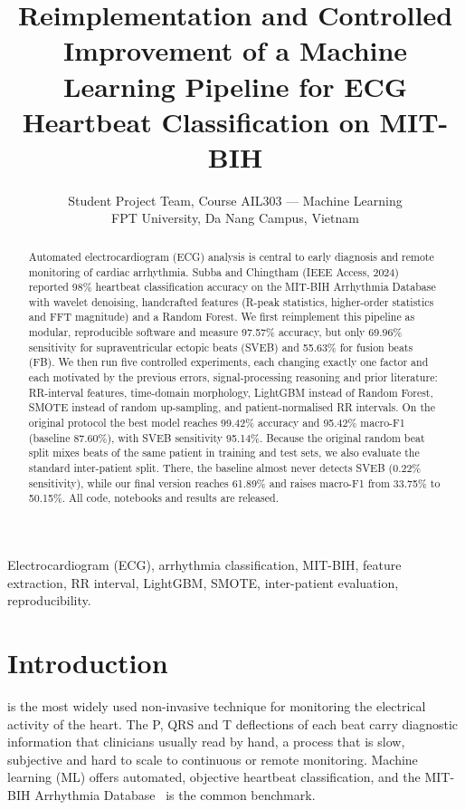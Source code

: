 \documentclass[journal]{IEEEtran}
\begin{document}
\title{Reimplementation and Controlled Improvement of a Machine Learning Pipeline for ECG Heartbeat Classification on MIT-BIH}

\author{Student Project Team, Course AIL303 --- Machine Learning\\
FPT University, Da Nang Campus, Vietnam}

\maketitle

\begin{abstract}
Automated electrocardiogram (ECG) analysis is central to early diagnosis and remote monitoring of cardiac arrhythmia. Subba and Chingtham (IEEE Access, 2024) reported 98\% heartbeat classification accuracy on the MIT-BIH Arrhythmia Database with wavelet denoising, handcrafted features (R-peak statistics, higher-order statistics and FFT magnitude) and a Random Forest. We first reimplement this pipeline as modular, reproducible software and measure 97.57\% accuracy, but only 69.96\% sensitivity for supraventricular ectopic beats (SVEB) and 55.63\% for fusion beats (FB). We then run five controlled experiments, each changing exactly one factor and each motivated by the previous errors, signal-processing reasoning and prior literature: RR-interval features, time-domain morphology, LightGBM instead of Random Forest, SMOTE instead of random up-sampling, and patient-normalised RR intervals. On the original protocol the best model reaches 99.42\% accuracy and 95.42\% macro-F1 (baseline 87.60\%), with SVEB sensitivity 95.14\%. Because the original random beat split mixes beats of the same patient in training and test sets, we also evaluate the standard inter-patient split. There, the baseline almost never detects SVEB (0.22\% sensitivity), while our final version reaches 61.89\% and raises macro-F1 from 33.75\% to 50.15\%. All code, notebooks and results are released.
\end{abstract}

\begin{IEEEkeywords}
Electrocardiogram (ECG), arrhythmia classification, MIT-BIH, feature extraction, RR interval, LightGBM, SMOTE, inter-patient evaluation, reproducibility.
\end{IEEEkeywords}

\section{Introduction}
 is the most widely used non-invasive technique for monitoring the electrical activity of the heart. The P, QRS and T deflections of each beat carry diagnostic information that clinicians usually read by hand, a process that is slow, subjective and hard to scale to continuous or remote monitoring. Machine learning (ML) offers automated, objective heartbeat classification, and the MIT-BIH Arrhythmia Database~\cite{moody2001} is the common benchmark.
\end{document}
